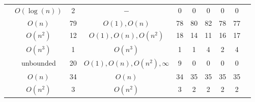 \begin{table}[ht]
{\begin{tabular}{ >{\scriptsize}c | >{\scriptsize}c | >{\scriptsize}c | >{\scriptsize}c | c | c | c | c | c | c }
            \cline{2-9}
            & $O(\log(n))$ &  2     &   $-$ & 0  & 0 & 0 & 0 & 0 \\
            \cline{2-9}
            & $O(n)$       & 79     &   $ O(1), O(n)$ & 78  & 80 & 82 & 78 & 77 & \\
            \cline{2-9}
            & $O(n^2)$     & 12     &   $O(1), O(n), O(n^2)$ & 18 & 14 & 11 & 16 & 17 \\
            \cline{2-9}
            & $O(n^3)$      &  1    &   $O(n^3)$     & 1  & 1 & 4 & 2 & 4 \\
            \cline{2-9}
            & unbounded    &  20    &   $O(1), O(n), O(n^2), \infty$  & 9  & 0 & 0 & 0 & 0 \\
            \hline \hline
            \multirow{3}{*}{Tianhan} 
            & $O(n)$       & 34     & $O(n) $ & 34 & 35 & 35 & 35 & 35 \\
            \cline{2-9}
            & $O(n^2)$      & 3    &  $O(n^2)$  & 3 & 2 & 2 & 2 & 2 \\
            \hline
            \end{tabular}
        }
        \vspace{-1cm}
    \end{table}
    
    